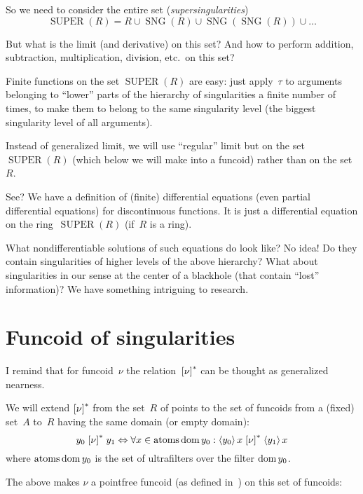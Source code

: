 So we need to consider the entire set (\emph{supersingularities})
\[
\operatorname{SUPER}(R) =
R\cup\operatorname{SNG}(R)\cup
\operatorname{SNG}(\operatorname{SNG}(R))\cup\dots
\]

But what is the limit (and derivative) on this set? And how to perform addition, subtraction, multiplication, division, etc.\ on this set?

Finite functions on the set $\operatorname{SUPER}(R)$ are easy: just apply~$\tau$ to arguments belonging to ``lower'' parts of the hierarchy of singularities a finite number of times, to make them to belong to the same singularity level (the biggest singularity level of all arguments).

Instead of generalized limit, we will use ``regular'' limit but on the set $\operatorname{SUPER}(R)$ (which below we will make into a funcoid) rather than on the set~$R$.

See? We have a definition of (finite) differential equations (even partial differential equations) for discontinuous functions. It is just a differential equation on the ring~$\operatorname{SUPER}(R)$ (if~$R$ is a ring).

What nondifferentiable solutions of such equations do look like? No idea! Do they contain singularities of higher levels of the above hierarchy? What about singularities in our sense at the center of a blackhole (that contain ``lost'' information)? We have something intriguing to research.

\chapter{Funcoid of singularities}

I remind that for funcoid~$\nu$ the relation~$\mathrel{\left[\nu\right]^{\ast}}$ can be thought as generalized nearness.

We will extend $\mathrel{\left[\nu\right]^{\ast}}$ from the set~$R$ of points to the set of funcoids from a (fixed) set~$A$ to~$R$ having the same domain (or empty domain):
\[
y_0 \mathrel{\left[\nu\right]^{\ast}} y_1 \Leftrightarrow
\forall x\in\operatorname{atoms}\operatorname{dom} y_0:
\left\langle y_0\right\rangle x \mathrel{\left[\nu\right]^{\ast}} \left\langle y_1\right\rangle x
\]
where $\operatorname{atoms}\operatorname{dom} y_0$ is the set of ultrafilters over the filter $\operatorname{dom} y_0$.

The above makes $\nu$ a pointfree funcoid (as defined in~\cite{volume-1-edition1}) on this set of funcoids:

